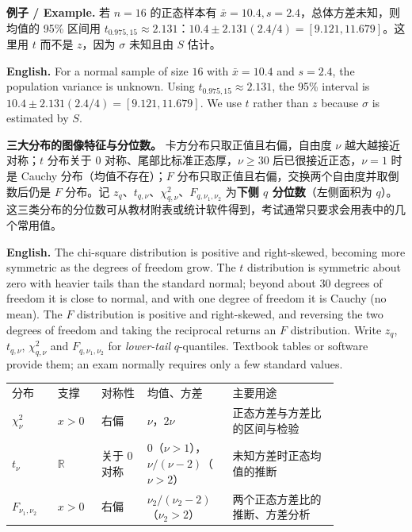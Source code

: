 \documentclass[UTF8,11pt,a4paper]{ctexart}
\newcommand{\EN}[1]{\par\noindent\textbf{English.} #1\par}
\newcommand{\EX}[2]{\par\noindent\textbf{例子 / Example.} #1\par\EN{#2}}
\begin{document}
\EX{若 $n=16$ 的正态样本有 $\bar x=10.4,s=2.4$，总体方差未知，则均值的 95\% 区间用 $t_{0.975,15}\approx2.131$：$10.4\pm2.131(2.4/4)=[9.121,11.679]$。这里用 $t$ 而不是 $z$，因为 $\sigma$ 未知且由 $S$ 估计。}{For a normal sample of size $16$ with $\bar x=10.4$ and $s=2.4$, the population variance is unknown. Using $t_{0.975,15}\approx2.131$, the 95\% interval is $10.4\pm2.131(2.4/4)=[9.121,11.679]$. We use $t$ rather than $z$ because $\sigma$ is estimated by $S$.}

\noindent\textbf{三大分布的图像特征与分位数。} 卡方分布只取正值且右偏，自由度 $\nu$ 越大越接近对称；$t$ 分布关于 $0$ 对称、尾部比标准正态厚，$\nu\ge30$ 后已很接近正态，$\nu=1$ 时是 Cauchy 分布（均值不存在）；$F$ 分布只取正值且右偏，交换两个自由度并取倒数后仍是 $F$ 分布。记 $z_q$、$t_{q,\nu}$、$\chi^2_{q,\nu}$、$F_{q,\nu_1,\nu_2}$ 为\textbf{下侧 $q$ 分位数}（左侧面积为 $q$）。这三类分布的分位数可从教材附表或统计软件得到，考试通常只要求会用表中的几个常用值。
\EN{The chi-square distribution is positive and right-skewed, becoming more symmetric as the degrees of freedom grow. The $t$ distribution is symmetric about zero with heavier tails than the standard normal; beyond about 30 degrees of freedom it is close to normal, and with one degree of freedom it is Cauchy (no mean). The $F$ distribution is positive and right-skewed, and reversing the two degrees of freedom and taking the reciprocal returns an $F$ distribution. Write $z_q$, $t_{q,\nu}$, $\chi^2_{q,\nu}$ and $F_{q,\nu_1,\nu_2}$ for \emph{lower-tail} $q$-quantiles. Textbook tables or software provide them; an exam normally requires only a few standard values.}
\begin{center}
\small
\begin{tabular}{p{0.12\linewidth}p{0.11\linewidth}p{0.12\linewidth}p{0.19\linewidth}p{0.28\linewidth}}
分布 & 支撑 & 对称性 & 均值、方差 & 主要用途\\
$\chi^2_\nu$ & $x>0$ & 右偏 & $\nu$，$2\nu$ & 正态方差与方差比的区间与检验\\
$t_\nu$ & $\mathbb R$ & 关于 $0$ 对称 & $0$（$\nu>1$），$\nu/(\nu-2)$（$\nu>2$） & 未知方差时正态均值的推断\\
$F_{\nu_1,\nu_2}$ & $x>0$ & 右偏 & $\nu_2/(\nu_2-2)$（$\nu_2>2$） & 两个正态方差比的推断、方差分析\\
\end{tabular}
\end{center}
\end{document}
